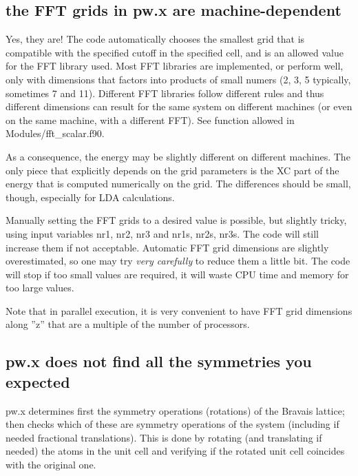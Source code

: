 \documentclass[12pt,a4paper]{article}
\begin{document}
\subsection{the FFT grids in pw.x are machine-dependent}
Yes, they are! The code automatically chooses the smallest grid that
is compatible with the 
specified cutoff in the specified cell, and is an allowed value for the FFT
library used. Most FFT libraries are implemented, or perform well, only
with dimensions that factors into products of small numers (2, 3, 5 typically,
sometimes 7 and 11). Different FFT libraries follow different rules and thus
different dimensions can result for the same system on different machines (or
even on the same machine, with a different FFT). See function allowed in
Modules/fft\_scalar.f90.
    
As a consequence, the energy may be slightly different on different machines. 
The only piece that explicitly depends on the grid parameters is
the XC part of the energy that is computed numerically on the grid. The
differences should be small, though, especially for LDA calculations.

Manually setting the FFT grids to a desired value is possible, but slightly
tricky, using input variables nr1, nr2, nr3 and nr1s, nr2s, nr3s. The
code will still increase them if not acceptable. Automatic FFT grid 
dimensions are slightly overestimated, so one may try {\em very carefully}
to reduce
them a little bit. The code will stop if too small values are required, it will
waste CPU time and memory for too large values.
    
Note that in parallel execution, it is very convenient to have FFT grid
dimensions along ''z'' that are a multiple of the number of processors.

\subsection{pw.x does not find all the symmetries you expected} 
pw.x determines first the symmetry operations (rotations) of the
Bravais lattice; then checks which of these are symmetry operations of
the system (including if needed fractional translations). This is done
by rotating (and translating if needed) the atoms in the unit cell and
verifying if the rotated unit cell coincides with the original one.
\end{document}
